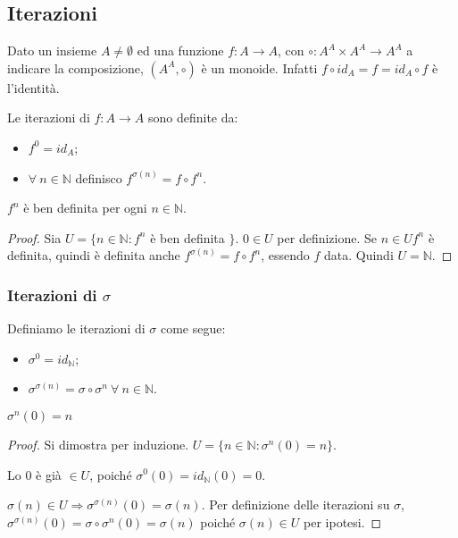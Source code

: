 \subsection{Iterazioni}

Dato un insieme $A \neq \emptyset$ ed una funzione $f : A \to A$, con $\circ : A^A \times A^A \to A^A$ a indicare la composizione, $(A^A, \circ)$ \`e un monoide. Infatti $f \circ id_A = f = id_A \circ f$ \`e l'identit\`a.

\begin{defn}[Iterazioni]
Le iterazioni di $f : A \to A$ sono definite da:
\begin{itemize}
  \item $f^0 = id_A$;
  \item $\forall \ n \in \mathbb{N}$ definisco $f^{\sigma(n)} = f \circ f^n$.
\end{itemize}
\end{defn}
\begin{prop}
$f^n$ \`e ben definita per ogni $n \in \mathbb{N}$.
\end{prop}
\begin{proof}
Sia $U = \{ n \in \mathbb{N} : f^n $ \`e ben definita $\}$. $0 \in U$ per definizione. Se $n \in U f^n$ \`e definita, quindi \`e definita anche $f^{\sigma(n)} = f \circ f^n$, essendo $f$ data. Quindi $U = \mathbb{N}$.
\end{proof}
\subsubsection{Iterazioni di $\sigma$}
\begin{defn}
Definiamo le iterazioni di $\sigma$ come segue:
\begin{itemize}
  \item $\sigma^0 = id_{\mathbb{N}}$;
  \item $\sigma^{\sigma(n)} = \sigma \circ \sigma^n \ \forall \ n \in \mathbb{N}$.
\end{itemize}
\end{defn}

\begin{prop}\label{iterazione_nesima}
$\sigma^n(0) = n$
\end{prop}
\begin{proof}
Si dimostra per induzione. $U = \{ n \in \mathbb{N} : \sigma^n(0) = n \}$. 

Lo 0 \`e gi\`a $\in U$, poich\'e $\sigma^0 (0) = id_{\mathbb{N}}(0) = 0$.

$\sigma(n) \in U \Rightarrow \sigma^{\sigma(n)} (0) = \sigma(n)$. Per definizione delle iterazioni su $\sigma$, $\sigma^{\sigma(n)}(0) = \sigma \circ \sigma^{n} (0) = \sigma(n)$ poich\'e $\sigma(n) \in U$ per ipotesi.
\end{proof}

